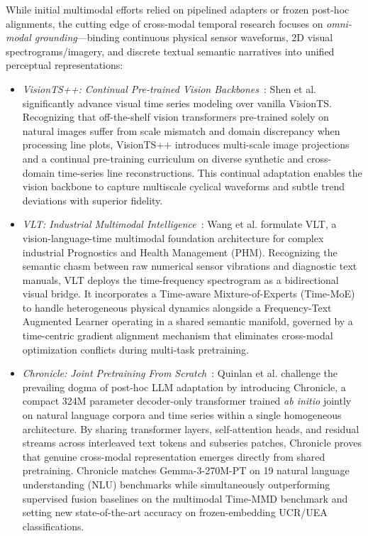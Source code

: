 While initial multimodal efforts relied on pipelined adapters or frozen post-hoc alignments, the cutting edge of cross-modal temporal research focuses on \emph{omni-modal grounding}—binding continuous physical sensor waveforms, 2D visual spectrograms/imagery, and discrete textual semantic narratives into unified perceptual representations:
\begin{itemize}[leftmargin=*]
    \item \emph{VisionTS++: Continual Pre-trained Vision Backbones}~\cite{shen2025visiontsplus}: Shen et al. significantly advance visual time series modeling over vanilla VisionTS. Recognizing that off-the-shelf vision transformers pre-trained solely on natural images suffer from scale mismatch and domain discrepancy when processing line plots, VisionTS++ introduces multi-scale image projections and a continual pre-training curriculum on diverse synthetic and cross-domain time-series line reconstructions. This continual adaptation enables the vision backbone to capture multiscale cyclical waveforms and subtle trend deviations with superior fidelity.
    \item \emph{VLT: Industrial Multimodal Intelligence}~\cite{wang2026vlt}: Wang et al. formulate VLT, a vision-language-time multimodal foundation architecture for complex industrial Prognostics and Health Management (PHM). Recognizing the semantic chasm between raw numerical sensor vibrations and diagnostic text manuals, VLT deploys the time-frequency spectrogram as a bidirectional visual bridge. It incorporates a Time-aware Mixture-of-Experts (Time-MoE) to handle heterogeneous physical dynamics alongside a Frequency-Text Augmented Learner operating in a shared semantic manifold, governed by a time-centric gradient alignment mechanism that eliminates cross-modal optimization conflicts during multi-task pretraining.
    \item \emph{Chronicle: Joint Pretraining From Scratch}~\cite{quinlan2026chronicle}: Quinlan et al. challenge the prevailing dogma of post-hoc LLM adaptation by introducing Chronicle, a compact 324M parameter decoder-only transformer trained \emph{ab initio} jointly on natural language corpora and time series within a single homogeneous architecture. By sharing transformer layers, self-attention heads, and residual streams across interleaved text tokens and subseries patches, Chronicle proves that genuine cross-modal representation emerges directly from shared pretraining. Chronicle matches Gemma-3-270M-PT on 19 natural language understanding (NLU) benchmarks while simultaneously outperforming supervised fusion baselines on the multimodal Time-MMD benchmark and setting new state-of-the-art accuracy on frozen-embedding UCR/UEA classifications.

\end{itemize}
